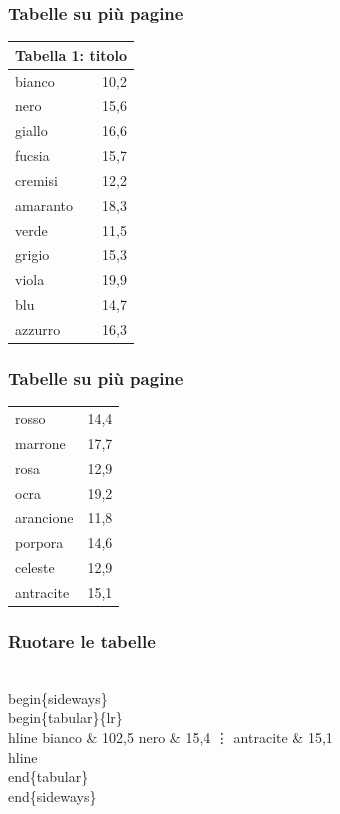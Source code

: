 \documentclass[svgnames,%
	ucs,%
	pdftex]{guitbeamer}
\begin{document}
\begin{frame}
  \frametitle{Tabelle su pi\`u pagine}
	\begin{LaTeXoutput}
		\begin{longtable}{lr}
		\multicolumn{2}{c}{Tabella 1: titolo}\\[1ex]\hline %
		bianco		& 10,2 \\
		nero		& 15,6 \\
		giallo		& 16,6 \\
		fucsia		& 15,7 \\
		cremisi		& 12,2 \\
		amaranto	& 18,3 \\
		verde		& 11,5 \\
		grigio		& 15,3 \\
		viola		& 19,9 \\
		blu		& 14,7 \\
		azzurro		& 16,3 
		\end{longtable}
	\end{LaTeXoutput}
\end{frame}
\begin{frame}
  \frametitle{Tabelle su pi\`u pagine}
	\begin{LaTeXoutput}
		\begin{longtable}{lr} %
		rosso		& 14,4 \\
		marrone		& 17,7 \\
		rosa		& 12,9 \\
		ocra		& 19,2 \\
		arancione	& 11,8 \\
		porpora		& 14,6 \\
		celeste		& 12,9 \\
		antracite	& 15,1 \\
		\hline
		\end{longtable}
	\end{LaTeXoutput}
\end{frame}
\begin{frame}
  \frametitle{Ruotare le tabelle}
	\begin{LaTeXcode}
		\alert{\\begin\{sideways\}}\n
		\\begin\{tabular\}\{lr\}\
		\\hline\n
		\hspace*{5ex}bianco    \& 102,5 \bs\bs\n
		\hspace*{5ex}nero      \& 15,4 \bs\bs\n
		\hspace*{10ex}\vdots\n
		\hspace*{5ex}antracite \& 15,1 \bs\bs\\hline\n
		\\end\{tabular\}\n
		\alert{\\end\{sideways\}}
	\end{LaTeXcode}
\end{frame}
\end{document}
